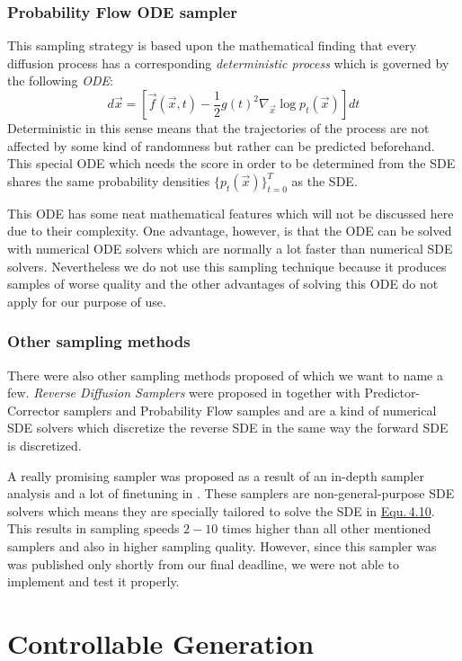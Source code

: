 \subsubsection{Probability Flow ODE sampler}
%
This sampling strategy is based upon the mathematical finding that every diffusion process has a corresponding \textit{deterministic process} which is governed by the following \textit{ODE}:
%
\begin{equation} \label{equ:4.21}
    d\vec{x}=\left[\vec{f}(\vec{x},t)-\frac{1}{2}g(t)^2\nabla_{\vec{x}}\log p_t(\vec{x})\right]dt
\end{equation}
%
Deterministic in this sense means that the trajectories of the process are not affected by some kind of randomness but rather can be predicted beforehand. This special ODE which needs the score in order to be determined from the SDE shares the same probability densities $\{p_t(\vec{x})\}_{t=0}^T$ as the SDE. 

This ODE has some neat mathematical features which will not be discussed here due to their complexity. One advantage, however, is that the ODE can be solved with numerical ODE solvers which are normally a lot faster than numerical SDE solvers. Nevertheless we do not use this sampling technique because it produces samples of worse quality and the other advantages of solving this ODE do not apply for our purpose of use.
%
\subsubsection{Other sampling methods}
%
There were also other sampling methods proposed of which we want to name a few. \textit{Reverse Diffusion Samplers} were proposed in \cite{score_3} together with Predictor-Corrector samplers and Probability Flow samples and are a kind of numerical SDE solvers which discretize the reverse SDE in the same way the forward SDE is discretized.

A really promising sampler was proposed as a result of an in-depth sampler analysis and a lot of finetuning in \cite{gotta_go_fast}. These samplers are non-general-purpose SDE solvers which means they are specially tailored to solve the SDE in \hyperref[equ:4.10]{Equ.\,4.10}. This results in sampling speeds $2-10$ times higher than all other mentioned samplers and also in higher sampling quality. However, since this sampler was was published only shortly from our final deadline, we were not able to implement and test it properly.

\section{Controllable Generation} \label{sec:4.5}

